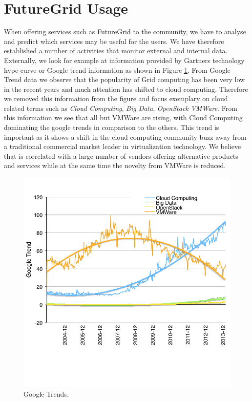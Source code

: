 
\section{FutureGrid Usage}

When offering services such as FutureGrid to the community, we have to
analyse and predict which services may be useful for the users. We
have therefore established a number of activities that monitor
external and internal data. Externally, we look for example at
information provided by Gartners technology hype curve \cite{?} or
Google trend information as shown in Figure \ref{F:google-trend}. From
Google Trend data we observe that the popularity of Grid computing
has been very low  in the recent years and much attention has shifted
to cloud computing. Therefore we removed this information from the
figure and focus exemplary on cloud related terms such as {\em Cloud
  Computing}, {\em Big Data}, {\em OpenStack} {\em VMWare}.
From this information we see that all but VMWare are rising, with
Cloud Computing dominating the google trends in comparison to the
others. This trend is important as it shows a shift in the cloud
computing community buzz away from a traditional commercial market
leader in virtualization technology. We believe that is correlated
with a large number of vendors offering alternative products and
services while at the same time the novelty from VMWare is reduced.

\begin{figure}[htb]
 \centering
    \includegraphics[width=.75\textwidth]{images/google-trend.pdf}
  \caption{Google Trends.}\label{F:google-trend}
\end{figure}

